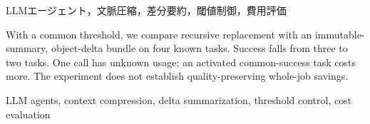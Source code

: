\begin{abstract}
LLMエージェントの同一閾値下で再帰置換と差分保持を既知4課題で比較した．成功は3件から2件へ減り，差分が届いた共通成功課題も増費用となった．使用量不明1呼出しを残し，品質を保つ総費用削減は確認できなかった．
\end{abstract}
\begin{keyword}
LLMエージェント，文脈圧縮，差分要約，閾値制御，費用評価
\end{keyword}
\begin{eabstract}
With a common threshold, we compare recursive replacement with an immutable-summary, object-delta bundle on four known tasks. Success falls from three to two tasks. One call has unknown usage; an activated common-success task costs more. The experiment does not establish quality-preserving whole-job savings.
\end{eabstract}
\begin{ekeyword}
LLM agents, context compression, delta summarization, threshold control, cost evaluation
\end{ekeyword}
